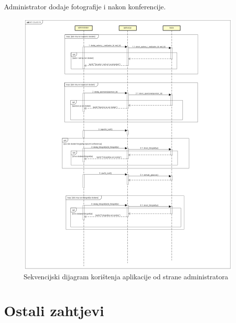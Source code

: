 				Administrator dodaje fotografije i nakon konferencije.

				\begin{figure}[H]
					\includegraphics[scale=0.3]{dijagrami/sekv2.png}%
					\centering
					\caption{Sekvencijski dijagram korištenja aplikacije od strane administratora}
					\label{fig:promjene10}
				\end{figure}
				\eject
	
		\section{Ostali zahtjevi}
		
		 
